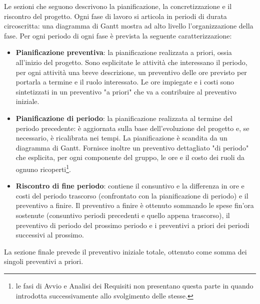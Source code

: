 Le sezioni che seguono descrivono la pianificazione, la concretizzazione e il riscontro del progetto. Ogni fase di lavoro si articola in periodi di durata circoscritta: una diagramma di Gantt mostra ad alto livello l'organizzazione della fase. Per ogni periodo di ogni fase è prevista la seguente caratterizzazione:
\begin{itemize}
	\item \textbf{Pianificazione preventiva}: la pianificazione realizzata a priori, ossia all'inizio del progetto. Sono esplicitate le attività che interessano il periodo, per ogni attività una breve descrizione, un preventivo delle ore previsto per portarla a termine e il ruolo interessato. Le ore impiegate e i costi sono sintetizzati in un preventivo "a priori" che va a contribuire al preventivo iniziale.
	
	\item \textbf{Pianificazione di periodo}: la pianificazione realizzata al termine del periodo precedente: è aggiornata sulla base dell'evoluzione del progetto e, se necessario, è ricalibrata nei tempi. La pianificazione è scandita da un diagramma di Gantt. Fornisce inoltre un preventivo dettagliato "di periodo" che esplicita, per ogni componente del gruppo, le ore e il costo dei ruoli da ognuno ricoperti\footnote{le fasi di Avvio e Analisi dei Requisiti non presentano questa parte in quando introdotta successivamente allo svolgimento delle stesse.}.
	
	\item \textbf{Riscontro di fine periodo}: contiene il consuntivo e la differenza in ore e costi del periodo trascorso (confrontato con la pianificazione di periodo) e il preventivo a finire. Il preventivo a finire è ottenuto sommando le spese fin'ora sostenute (consuntivo periodi precedenti e quello appena trascorso), il preventivo di periodo del prossimo periodo e i preventivi a priori dei periodi successivi al prossimo.
	
\end{itemize}

La sezione finale prevede il preventivo iniziale totale, ottenuto come somma dei singoli preventivi a priori.
